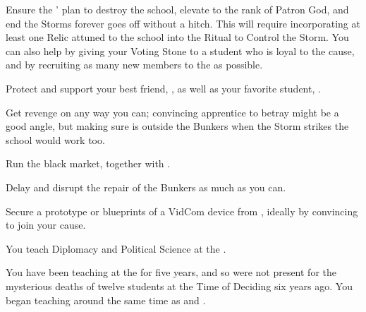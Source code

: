 \documentclass[char]{GL2020}
\begin{document}
\begin{itemz}
    \item Ensure the \pGoaties{}' plan to destroy the school, elevate \cGenesis{} to the rank of Patron God, and end the Storms forever goes off without a hitch. This will require incorporating at least one Relic attuned to the school into the Ritual to Control the Storm. You can also help by giving your Voting Stone to a student who is loyal to the cause, and by recruiting as many new members to the \pGoaties{} as possible.
    \item Protect and support your best friend, \cHeadScientist{}, as well as your favorite student, \cTechStar{}.
    \item Get revenge on \cAntiChup{} any way you can; convincing \cAntiChup{\their} apprentice \cScholarship{} to betray \cAntiChup{\them} might be a good angle, but making sure \cAntiChup{} is outside the Bunkers when the Storm strikes the school would work too.
    \item Run the black market, together with \cChupSecond{}.
    \item Delay and disrupt the repair of the Bunkers as much as you can.
    \item Secure a prototype or blueprints of a VidCom device from \cTechStar{}, ideally by convincing \cTechStar{\them} to join your cause. 
\end{itemz}

\begin{itemz}[Notes]
    \item You teach Diplomacy and Political Science at the \pSchool{}.
    \item You have been teaching at the \pSc{} for five years, and so were not present for the mysterious deaths of twelve students at the Time of Deciding six years ago. You began teaching around the same time as \cPrince{} and \cChupSecond{}.
\end{itemz}
\end{document}
